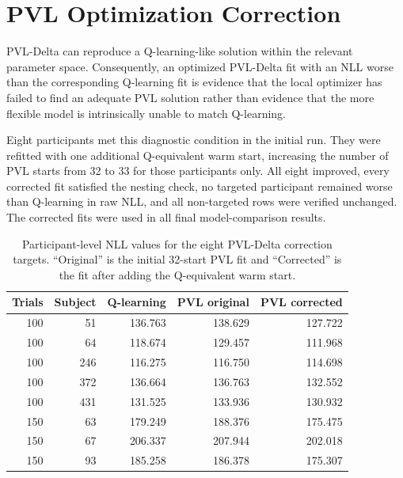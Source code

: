 \section{PVL Optimization Correction}
PVL-Delta can reproduce a Q-learning-like solution within the relevant parameter space. Consequently, an optimized PVL-Delta fit with an NLL worse than the corresponding Q-learning fit is evidence that the local optimizer has failed to find an adequate PVL solution rather than evidence that the more flexible model is intrinsically unable to match Q-learning.

Eight participants met this diagnostic condition in the initial run. They were refitted with one additional Q-equivalent warm start, increasing the number of PVL starts from 32 to 33 for those participants only. All eight improved, every corrected fit satisfied the nesting check, no targeted participant remained worse than Q-learning in raw NLL, and all non-targeted rows were verified unchanged. The corrected fits were used in all final model-comparison results.

\begin{table}[H]
    \centering
    \caption{Participant-level NLL values for the eight PVL-Delta correction targets. ``Original'' is the initial 32-start PVL fit and ``Corrected'' is the fit after adding the Q-equivalent warm start.}\label{tab:pvl-correction}
    \small
    \begin{tabular}{@{}rrrrr@{}}
        \toprule
        Trials & Subject & Q-learning & PVL original & PVL corrected \\
        \midrule
        100    & 51      & 136.763    & 138.629      & 127.722       \\
        100    & 64      & 118.674    & 129.457      & 111.968       \\
        100    & 246     & 116.275    & 116.750      & 114.698       \\
        100    & 372     & 136.664    & 136.763      & 132.552       \\
        100    & 431     & 131.525    & 133.936      & 130.932       \\
        150    & 63      & 179.249    & 188.376      & 175.475       \\
        150    & 67      & 206.337    & 207.944      & 202.018       \\
        150    & 93      & 185.258    & 186.378      & 175.307       \\
        \bottomrule
    \end{tabular}
\end{table}


